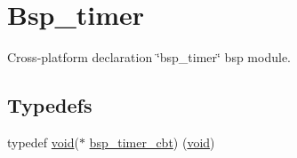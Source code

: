 \hypertarget{group__bsp__timer}{}\section{Bsp\+\_\+timer}
\label{group__bsp__timer}


Cross-\/platform declaration \char`\"{}bsp\+\_\+timer\char`\"{} bsp module.  


\subsection*{Typedefs}
\begin{DoxyCompactItemize}
\item 
typedef \hyperlink{usb__devapi_8h_afabf60e7f57651d6d595a02c75f07cd0}{void}($\ast$ \hyperlink{group__bsp__timer_ga70c37f3709ac6eb30352181337000ba4}{bsp\+\_\+timer\+\_\+cbt}) (\hyperlink{usb__devapi_8h_afabf60e7f57651d6d595a02c75f07cd0}{void})
\end{DoxyCompactItemize}
